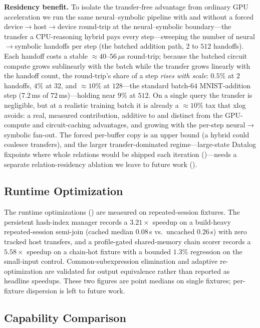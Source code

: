 \textbf{Residency benefit.} To isolate the transfer-free advantage from ordinary GPU acceleration we run the same neural--symbolic pipeline with and without a forced device$\to$host$\to$device round-trip at the neural--symbolic boundary---the transfer a CPU-reasoning hybrid pays every step---sweeping the number of neural$\to$symbolic handoffs per step (the batched addition path, $2$ to $512$ handoffs). Each handoff costs a stable ${\approx}40$--$56\,\mu$s round-trip; because the batched circuit compute grows sublinearly with the batch while the transfer grows linearly with the handoff count, the round-trip's share of a step \emph{rises with scale}: $0.5\%$ at $2$ handoffs, $4\%$ at $32$, and ${\approx}10\%$ at $128$---the standard batch-$64$ MNIST-addition step ($7.2$\,ms of $72$\,ms)---holding near $9\%$ at $512$. On a single query the transfer is negligible, but at a realistic training batch it is already a ${\approx}10\%$ tax that xlog avoids: a real, measured contribution, additive to and distinct from the GPU-compute and circuit-caching advantages, and growing with the per-step neural$\to$symbolic fan-out. The forced per-buffer copy is an upper bound (a hybrid could coalesce transfers), and the larger transfer-dominated regime---large-state Datalog fixpoints where whole relations would be shipped each iteration ()---needs a separate relation-residency ablation we leave to future work ().

\subsection{Runtime Optimization}\label{sec:runtime-eval}

The runtime optimizations () are measured on repeated-session fixtures. The persistent hash-index manager records a $3.21\times$ speedup on a build-heavy repeated-session semi-join (cached median $0.08$\,s vs.\ uncached $0.26$\,s) with zero tracked host transfers, and a profile-gated shared-memory chain scorer records a $5.58\times$ speedup on a chain-hot fixture with a bounded $1.3\%$ regression on the small-input control. Common-subexpression elimination and adaptive re-optimization are validated for output equivalence rather than reported as headline speedups. These two figures are point medians on single fixtures; per-fixture dispersion is left to future work.

\subsection{Capability Comparison}

